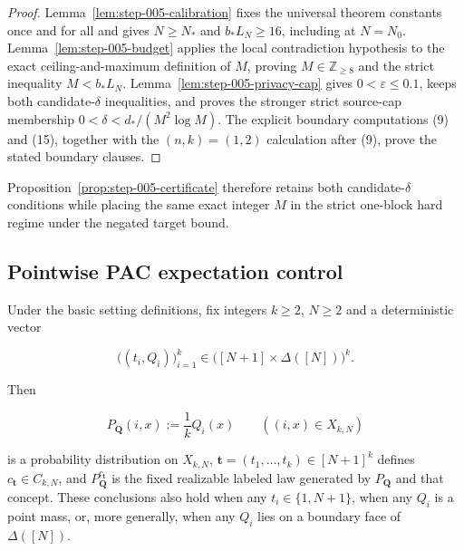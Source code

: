 \begin{proof}
Lemma~\ref{lem:step-005-calibration} fixes the universal theorem constants
once and for all and gives \(N\ge N_*\) and \(b_*L_N\ge16\), including at
\(N=N_0\). Lemma~\ref{lem:step-005-budget} applies the local contradiction
hypothesis to the exact ceiling-and-maximum definition of \(M\), proving
\(M\in\mathbb Z_{\ge8}\) and the strict inequality \(M<b_*L_N\).
Lemma~\ref{lem:step-005-privacy-cap} gives \(0<\varepsilon\le0.1\), keeps
both candidate-$\delta$ inequalities, and proves the stronger strict
source-cap membership \(0<\delta<d_*/(M^2\log M)\).
The explicit boundary computations (9) and (15), together with the
\((n,k)=(1,2)\) calculation after (9), prove the stated boundary clauses.
\end{proof}
Proposition~\ref{prop:step-005-certificate} therefore retains both
candidate-$\delta$ conditions while placing the same exact integer $M$ in
the strict one-block hard regime under the negated target bound.

\subsection{Pointwise PAC expectation control}\label{app:step-006}
\begin{lemma}\label{lem:step-006-fixed-product-realizable}
Under the basic setting definitions, fix integers \(k\ge2\), \(N\ge2\)
and a deterministic vector

\[
\bigl((t_i,Q_i)\bigr)_{i=1}^k
\in\bigl([N+1]\times\Delta([N])\bigr)^k.
\]

Then

\[
P_{\boldsymbol Q}(i,x):=\frac1kQ_i(x)
\qquad((i,x)\in X_{k,N})
\]

is a probability distribution on \(X_{k,N}\),
\(\boldsymbol t=(t_1,\ldots,t_k)\in[N+1]^k\) defines
\(c_{\boldsymbol t}\in C_{k,N}\), and
\(P_{\boldsymbol Q}^{c_{\boldsymbol t}}\) is the fixed realizable
labeled law generated by \(P_{\boldsymbol Q}\) and that concept. These
conclusions also hold when any \(t_i\in\{1,N+1\}\), when any \(Q_i\) is
a point mass, or, more generally, when any \(Q_i\) lies on a boundary face
of \(\Delta([N])\).
\end{lemma}

